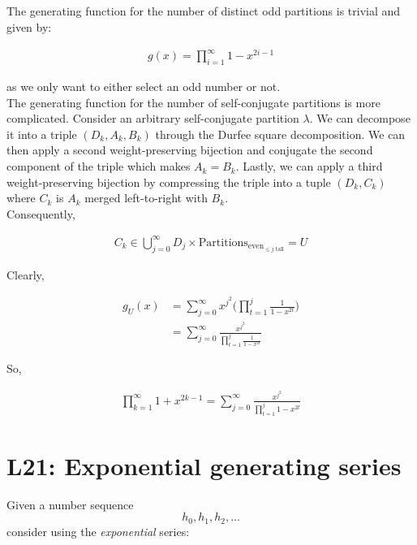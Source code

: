 \documentclass{report}
\begin{document}
{The generating function for the number of distinct odd partitions
is trivial and given by:

\begin{align*}
    g(x) = \prod_{i=1}^{\infty} 1 - x^{2i-1}
\end{align*}

as we only want to either select an odd number or not. \\

The generating function for the number of self-conjugate partitions
is more complicated. Consider an arbitrary self-conjugate partition
$\lambda$. We can decompose it into a triple $(D_k, A_k, B_k)$ through
the Durfee square decomposition. We can then apply a second weight-preserving
bijection and conjugate the second component of the triple which makes
$A_k = B_k$. Lastly, we can apply a third weight-preserving bijection
by compressing the triple into a tuple $(D_k, C_k)$ where $C_k$ is
$A_k$ merged left-to-right with $B_k$. \\

Consequently,

\begin{align*}
    C_k \in \bigcup_{j=0}^{\infty} D_j \times \text{Partitions}_{\text{even}_{\le j \text { tall}}} = U
\end{align*}

Clearly,

\begin{align*}
    g_{U}(x) & = \sum_{j=0}^{\infty} x^{j^2} \Big ( \prod_{t=1}^{j} \frac{1}{1 - x^{2t}} \Big ) \\
             & = \sum_{j=0}^{\infty} \frac{x^{j^2}}{\prod_{t=1}^{j} \frac{1}{1 - x^{2t}}}
\end{align*}

So,

\begin{align*}
    \prod_{k=1}^{\infty} 1 + x^{2k - 1} = \sum_{j=0}^{\infty} \frac{x^{j^2}}{\prod_{t=1}^{j} 1 - x^{2t}}
\end{align*}


\section{L21: Exponential generating series}

Given a number sequence $$h_0, h_1, h_2, \dots$$ consider
using the \textit{exponential} series:


}
\end{document}
